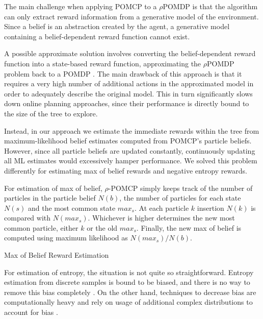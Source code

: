 The main challenge when applying POMCP to a $\rho$POMDP is that the algorithm can only extract
reward information from a generative model of the environment. Since a belief is an abstraction
created by the agent, a generative model containing a belief-dependent reward function cannot exist.

A possible approximate solution involves converting the belief-dependent reward function into a
state-based reward function, approximating the $\rho$POMDP problem back to a POMDP \cite{cit:rpomdp}.
The main drawback of this approach is that it requires a very high number of additional actions in
the approximated model in order to adequately describe the original model. This in turn
significantly slows down online planning approaches, since their performance is directly bound to
the size of the tree to explore.

Instead, in our approach we estimate the immediate rewards within the tree from maximum-likelihood
belief estimates computed from POMCP's particle beliefs. However, since all particle beliefs are
updated constantly, continuously updating all ML estimates would excessively hamper performance. We
solved this problem differently for estimating max of belief rewards and negative entropy rewards.

For estimation of max of belief, $\rho$-POMCP simply keeps track of the number of particles in the
particle belief $N(b)$, the number of particles for each state $N(s)$ and the most common
state $max_s$. At each particle $k$ insertion $N(k)$ is compared with $N(max_s)$. Whichever is higher
determines the new most common particle, either $k$ or the old $max_s$. Finally, the new max of
belief is computed using maximum likelihood as $N(max_s)/N(b)$.

\begin{algorithm}[H]
    \caption{Max of Belief Reward Estimation}

\end{algorithm}

For estimation of entropy, the situation is not quite so straightforward. Entropy estimation from
discrete samples is bound to be biased, and there is no way to remove this bias completely
\cite{cit:badentropy}. On the other hand, techniques to decrease bias are computationally heavy and
rely on usage of additional complex distributions to account for bias \cite{cit:entropyfixes}.

